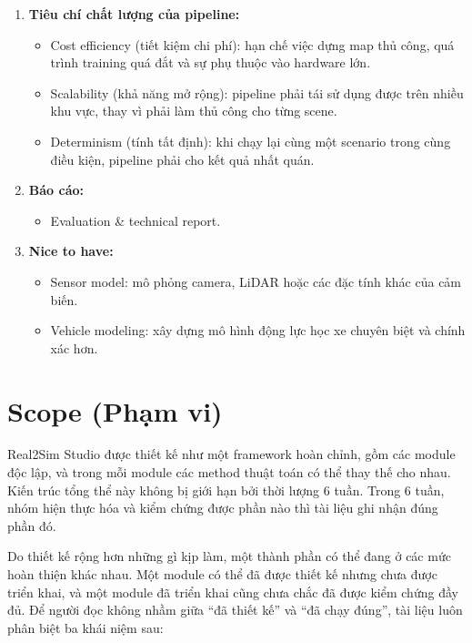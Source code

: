 \begin{enumerate}
\begin{itemize}
  \end{itemize}
  \item \textbf{Tiêu chí chất lượng của pipeline:}
  \begin{itemize}
    \item Cost efficiency (tiết kiệm chi phí): hạn chế việc dựng map thủ công, quá trình training quá đắt và sự phụ thuộc vào hardware lớn.
    \item Scalability (khả năng mở rộng): pipeline phải tái sử dụng được trên nhiều khu vực, thay vì phải làm thủ công cho từng scene.
    \item Determinism (tính tất định): khi chạy lại cùng một scenario trong cùng điều kiện, pipeline phải cho kết quả nhất quán.
  \end{itemize}
  \item \textbf{Báo cáo:}
  \begin{itemize}
    \item Evaluation \& technical report.
  \end{itemize}
  \item \textbf{Nice to have:}
  \begin{itemize}
    \item Sensor model: mô phỏng camera, LiDAR hoặc các đặc tính khác của cảm biến.
    \item Vehicle modeling: xây dựng mô hình động lực học xe chuyên biệt và chính xác hơn.
  \end{itemize}
\end{enumerate}

\section{Scope (Phạm vi)}

Real2Sim Studio được thiết kế như một framework hoàn chỉnh, gồm các module độc lập, và trong mỗi module các method thuật toán có thể thay thế cho nhau. Kiến trúc tổng thể này không bị giới hạn bởi thời lượng 6 tuần. Trong 6 tuần, nhóm hiện thực hóa và kiểm chứng được phần nào thì tài liệu ghi nhận đúng phần đó.

Do thiết kế rộng hơn những gì kịp làm, một thành phần có thể đang ở các mức hoàn thiện khác nhau. Một module có thể đã được thiết kế nhưng chưa được triển khai, và một module đã triển khai cũng chưa chắc đã được kiểm chứng đầy đủ. Để người đọc không nhầm giữa ``đã thiết kế'' và ``đã chạy đúng'', tài liệu luôn phân biệt ba khái niệm sau:

